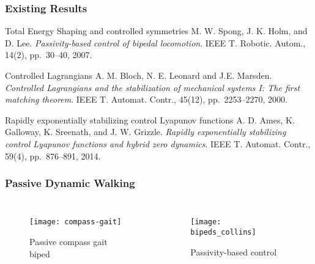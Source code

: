 \begin{frame}[t]
  \frametitle{Existing Results}
  \begin{block}{Total Energy Shaping and controlled symmetries}
    \small
    M. W. Spong, J. K. Holm, and D. Lee. {\em Passivity-based control of
      bipedal locomotion}. IEEE T. Robotic. Autom., 14(2), pp.~30--40,
    2007.
  \end{block}
  \begin{block}{Controlled Lagrangians}
    \small
    A. M. Bloch, N. E. Leonard and J.E. Marsden. {\em Controlled Lagrangians
      and the stabilization of mechanical systems I: The first matching
      theorem}. IEEE T. Automat. Contr., 45(12), pp.~2253--2270, 2000.
  \end{block}
  \begin{block}{Rapidly exponentially stabilizing control Lyapunov functions}
    \small
    A. D. Ames, K. Galloway, K. Sreenath, and J. W. Grizzle. {\em Rapidly
    exponentially stabilizing control Lyapunov functions and hybrid zero
    dynamics}. IEEE T. Automat. Contr., 59(4), pp.~876--891, 2014.
  \end{block}
\end{frame}

\begin{frame}[t]
  \frametitle{Passive Dynamic Walking}
  \vspace{-1em}
  \begin{columns}    
    \begin{figure}
      \centering
      \texttt{[image: compass-gait]}
      \vspace{-.8em}
      \caption{Passive compass gait biped}
    \end{figure}
    \begin{figure}
      \centering
      \texttt{[image: bipeds\_collins]}
      \vspace{-.8em}
      \caption{Passivity-based control}
    \end{figure}
  \end{columns}
\end{frame}
